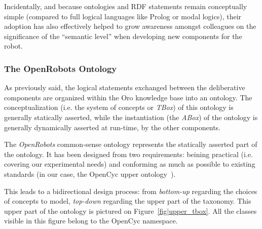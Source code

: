 \documentclass[preprint,3p,times]{elsarticle}
\newcommand{\ie}{i.e.\xspace}
\begin{document}
Incidentally, and because ontologies and RDF statements remain conceptually
simple (compared to full logical languages like {\sc Prolog} or modal logics),
their adoption has also effectively helped to grow awareness amongst colleagues
on the significance of the ``semantic level'' when developing new components
for the robot.

\subsubsection{The OpenRobots Ontology}

As previously said, the logical statements exchanged between the deliberative
components are organized within the {\sc Oro} knowledge base into an ontology.
The conceptualization (\ie the system of concepts or \emph{TBox}) of this
ontology is generally statically asserted, while the instantiation (the
\emph{ABox}) of the ontology is generally dynamically asserted at run-time, by
the other components.

The \emph{OpenRobots} common-sense ontology represents the statically asserted
part of the ontology. It has been designed from two requirements: beining
practical (\ie covering our experimental needs) and conforming as much as
possible to existing standards (in our case, the {\sc OpenCyc} upper
ontology~\cite{lenat1990cyc}).

This leads to a bidirectional design process: from \emph{bottom-up} regarding
the choices of concepts to model, \emph{top-down} regarding the upper part of
the taxonomy. This upper part of the ontology is pictured on
Figure~\ref{fig|upper_tbox}. All the classes visible in this figure belong to
the {\sc OpenCyc} namespace.
\end{document}
